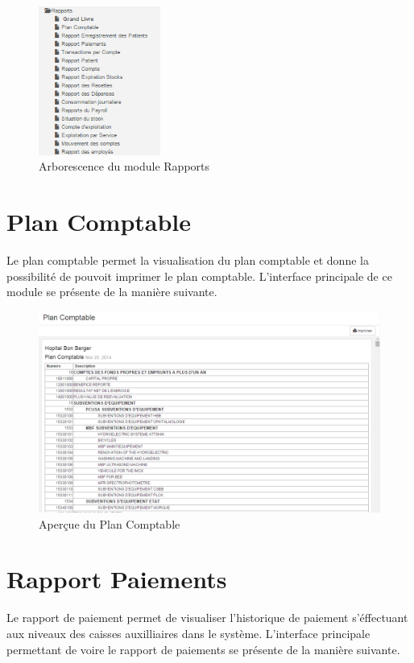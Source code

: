 \documentclass[12pt,a4paper]{report}
\begin{document}
\begin{figure}[h]
\begin{center}
\includegraphics[width=4cm]{pic/ArboReport.png}
\end{center}
\caption{Arborescence du module Rapports}
\label{Arborescence du module Rapports}
\end{figure}
\newpage
\section{Plan Comptable}
Le plan comptable permet la visualisation du plan comptable et donne la possibilité de pouvoit imprimer le plan comptable. L'interface principale de ce module se présente de la manière suivante. 

\begin{figure}[h]
\begin{center}
\includegraphics[width=14cm]{pic/PlanComptableAf.png}
\end{center}
\caption{Aperçue du Plan Comptable}
\label{Aperçue du Plan Comptable}
\end{figure}

\newpage
\section{Rapport Paiements}
Le rapport de paiement permet de visualiser l'historique de paiement s'éffectuant aux niveaux des caisses auxilliaires dans le système. L'interface principale permettant de voire le rapport de paiements se présente de la manière suivante. 
\end{document}
